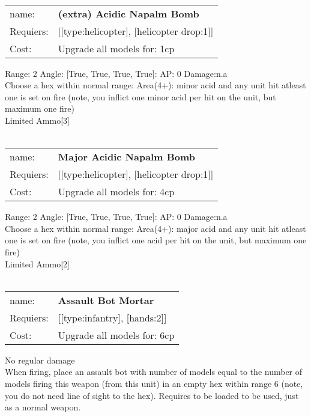 \ \\
\begin{tabular}{ll}
name: & {\bf (extra) Acidic Napalm Bomb } \\
Requiers: & [[type:helicopter], [helicopter drop:1]] \\
Cost: & Upgrade all models for: 1cp \\
\end{tabular}



Range: 2  Angle: [True, True, True, True]: AP: 0 Damage:n.a \\
Choose a hex within normal range: Area(4+): minor acid and any unit hit atleast one is set on fire (note, you inflict one minor acid per hit on the unit, but maximum one fire)\\ 
Limited Ammo[3]\\ 








\ \\
\begin{tabular}{ll}
name: & {\bf Major Acidic Napalm Bomb } \\
Requiers: & [[type:helicopter], [helicopter drop:1]] \\
Cost: & Upgrade all models for: 4cp \\
\end{tabular}



Range: 2  Angle: [True, True, True, True]: AP: 0 Damage:n.a \\
Choose a hex within normal range: Area(4+): major acid and any unit hit atleast one is set on fire (note, you inflict one acid per hit on the unit, but maximum one fire)\\ 
Limited Ammo[2]\\ 








\ \\
\begin{tabular}{ll}
name: & {\bf Assault Bot Mortar } \\
Requiers: & [[type:infantry], [hands:2]] \\
Cost: & Upgrade all models for: 6cp \\
\end{tabular}

No regular damage\\ 
When firing, place an assault bot with number of models equal to the number of models firing this weapon (from this unit) in an empty hex within range 6 (note, you do not need line of sight to the hex). Requires to be loaded to be used, just as a normal weapon.\\ 









